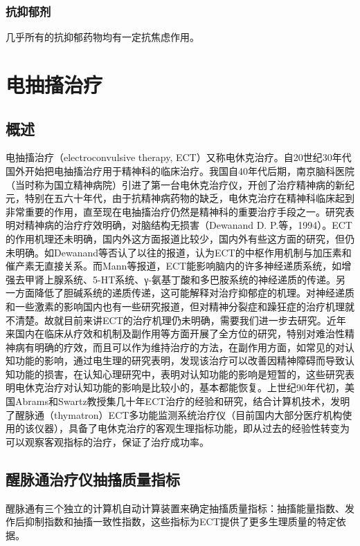\subsubsection{抗抑郁剂}

几乎所有的抗抑郁药物均有一定抗焦虑作用。


\section{电抽搐治疗}

\subsection{概述}

电抽搐治疗（electroconvulsive therapy,
ECT）又称电休克治疗。自20世纪30年代国外开始把电抽搐治疗用于精神科的临床治疗。我国自40年代后期，南京脑科医院（当时称为国立精神病院）引进了第一台电休克治疗仪，开创了治疗精神病的新纪元，特别在五六十年代，由于抗精神病药物的缺乏，电休克治疗在精神科临床起到非常重要的作用，直至现在电抽搐治疗仍然是精神科的重要治疗手段之一。研究表明对精神病的治疗疗效明确，对脑结构无损害（Dewanand
D.
P.等，1994）。ECT的作用机理还未明确，国内外这方面报道比较少，国内外有些这方面的研究，但仍未明确。如Dewanand等否认了以往的报道，认为ECT的中枢作用机制与加压素和催产素无直接关系。而Mann等报道，ECT能影响脑内的许多神经递质系统，如增强去甲肾上腺系统、5-HT系统、γ-氨基丁酸和多巴胺系统的神经递质的传递。另一方面降低了胆碱系统的递质传递，这可能解释对治疗抑郁症的机理。对神经递质和一些激素的影响国内也有一些研究报道，但对精神分裂症和躁狂症的治疗机理就不清楚。故就目前来讲ECT的治疗机理仍未明确，需要我们进一步去研究。近年来国内在临床从疗效和机制及副作用等方面开展了全方位的研究，特别对难治性精神病有明确的疗效，而且可以作为维持治疗的方法，在副作用方面，如常见的对认知功能的影响，通过电生理的研究表明，发现该治疗可以改善因精神障碍而导致认知功能的损害，在认知心理研究中，表明对认知功能的影响是短暂的，这些研究表明电休克治疗对认知功能的影响是比较小的，基本都能恢复。上世纪90年代初，美国Abrams和Swartz教授集几十年ECT治疗的经验和研究，结合计算机技术，发明了醒脉通（thymatron）ECT多功能监测系统治疗仪（目前国内大部分医疗机构使用的该仪器），具备了电休克治疗的客观生理指标功能，即从过去的经验性转变为可以观察客观指标的治疗，保证了治疗成功率。

\subsection{醒脉通治疗仪抽搐质量指标}

醒脉通有三个独立的计算机自动计算装置来确定抽搐质量指标：抽搐能量指数、发作后抑制指数和抽搐一致性指数，这些指标为ECT提供了更多生理质量的特定依据。

